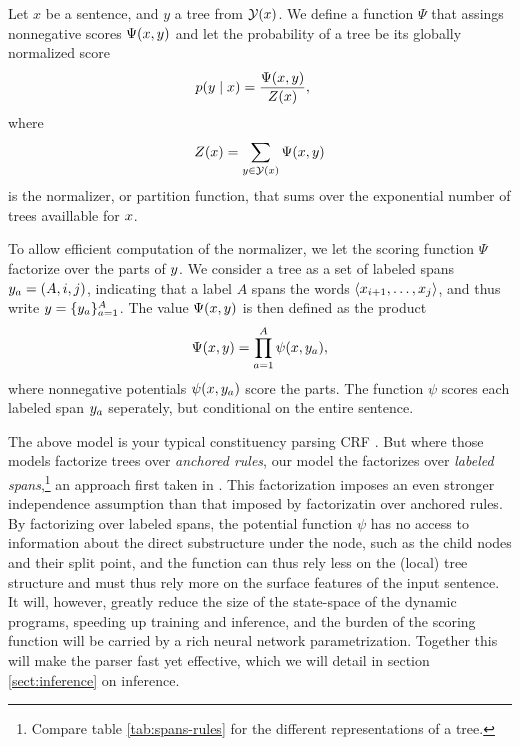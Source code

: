     Let $x$ be a sentence, and $y$ a tree from $\mathcal{Y}(x)$. We define a function $\Psi$ that assings nonnegative scores $\Psi(x, y)$ and let the probability of a tree be its globally normalized score
    \begin{align}
      \label{eq:crf-model}
      p(y \mid x) &= \frac{\Psi(x, y)}{Z(x)},
    \end{align}
    where
    \begin{align*}
      Z(x) = \sum_{ y \in \mathcal{Y}(x) } \Psi(x, y)
    \end{align*}
    is the normalizer, or partition function, that sums over the exponential number of trees availlable for $x$.

    To allow efficient computation of the normalizer, we let the scoring function $\Psi$ factorize over the parts of $y$. We consider a tree as a set of labeled spans $y_a = (A, i, j)$, indicating that a label $A$ spans the words $\langle x_{i+1}, \dots, x_j \rangle$, and thus write $y = \{ y_a \}_{a=1}^A$. The value $\Psi(x, y)$ is then defined as the product
    \begin{align}
      \Psi(x, y) = \prod_{a=1}^A \psi(x, y_a),
    \end{align}
    where nonnegative potentials $\psi(x, y_a)$ score the parts. The function $\psi$ scores each labeled span $y_a$ seperately, but conditional on the entire sentence.

    The above model is your typical constituency parsing CRF \citep{finkel2008crf,klein2015crf}. But where those models factorize trees over \textit{anchored rules}, our model the factorizes over \textit{labeled spans},\footnote{Compare table \ref{tab:spans-rules} for the different representations of a tree.} an approach first taken in \citet{stern2017minimal}. This factorization imposes an even stronger independence assumption than that imposed by factorizatin over anchored rules. By factorizing over labeled spans, the potential function $\psi$ has no access to information about the direct substructure under the node, such as the child nodes and their split point, and the function can thus rely less on the (local) tree structure and must thus rely more on the surface features of the input sentence. It will, however, greatly reduce the size of the state-space of the dynamic programs, speeding up training and inference, and the burden of the scoring function will be carried by a rich neural network parametrization. Together this will make the parser fast yet effective, which we will detail in section \ref{sect:inference} on inference.

